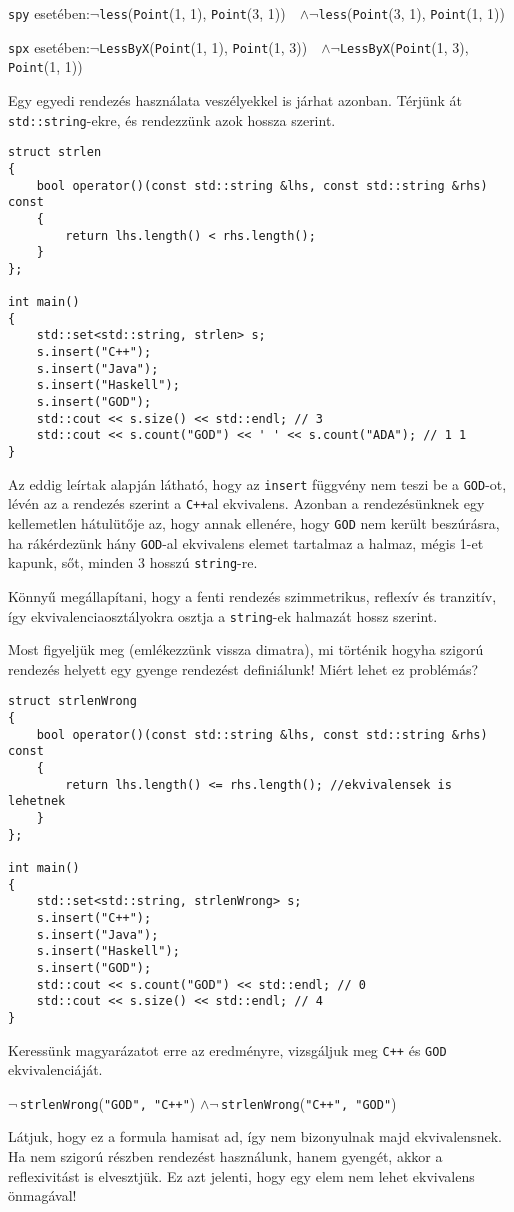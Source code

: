 \documentclass[a4paper,11.5pt,table]{article}
\begin{document}
	\begin{center}	
		\texttt{spy} esetében:\quad  $\neg$\texttt{less}\big(\texttt{Point}(1, 1), \texttt{Point}(3, 1)\big) \,\, $\wedge$\quad $\neg$\texttt{less}\big(\texttt{Point}(3, 1), \texttt{Point}(1, 1)\big)
		
		\texttt{spx} esetében:\quad  $\neg$\texttt{LessByX}\big(\texttt{Point}(1, 1), \texttt{Point}(1, 3)\big) \,\, $\wedge$\quad $\neg$\texttt{LessByX}\big(\texttt{Point}(1, 3), \texttt{Point}(1, 1)\big)
	\end{center}
	Egy egyedi rendezés használata veszélyekkel is járhat azonban. Térjünk át \texttt{std::string}-ekre, és rendezzünk azok hossza szerint.
	\begin{lstlisting}
struct strlen
{
	bool operator()(const std::string &lhs, const std::string &rhs) const
	{
		return lhs.length() < rhs.length();
	}
};

int main()
{
	std::set<std::string, strlen> s;
	s.insert("C++");
	s.insert("Java");
	s.insert("Haskell");
	s.insert("GOD");
	std::cout << s.size() << std::endl; // 3
	std::cout << s.count("GOD") << ' ' << s.count("ADA"); // 1 1
}
\end{lstlisting}
	Az eddig leírtak alapján látható, hogy az \texttt{insert} függvény nem teszi be a \texttt{GOD}-ot, lévén az a rendezés szerint a \texttt{C++}al ekvivalens. Azonban a rendezésünknek egy kellemetlen hátulütője az, hogy annak ellenére, hogy \texttt{GOD} nem került beszúrásra, ha rákérdezünk hány \texttt{GOD}-al ekvivalens elemet tartalmaz a halmaz, mégis 1-et kapunk, sőt, minden 3 hosszú \texttt{string}-re.
	\begin{note}
		Könnyű megállapítani, hogy a fenti rendezés szimmetrikus, reflexív és tranzitív, így ekvivalenciaosztályokra osztja a \texttt{string}-ek halmazát hossz szerint.
	\end{note}
	Most figyeljük meg (emlékezzünk vissza dimatra), mi történik hogyha szigorú rendezés helyett egy gyenge rendezést definiálunk! Miért lehet ez problémás?
\begin{lstlisting}
struct strlenWrong
{
	bool operator()(const std::string &lhs, const std::string &rhs) const
	{
		return lhs.length() <= rhs.length(); //ekvivalensek is lehetnek
	}
};

int main()
{
	std::set<std::string, strlenWrong> s;
	s.insert("C++");
	s.insert("Java");
	s.insert("Haskell");
	s.insert("GOD");
	std::cout << s.count("GOD") << std::endl; // 0
	std::cout << s.size() << std::endl; // 4
}
\end{lstlisting}
	Keressünk magyarázatot erre az eredményre, vizsgáljuk meg \texttt{C++} és \texttt{GOD} ekvivalenciáját.
	\begin{center}
		$\neg$\,\texttt{strlenWrong}\big(\texttt{"GOD", "C++"}\big)\quad 
		$\wedge$\quad $\neg$\,\texttt{strlenWrong}\big(\texttt{"C++", "GOD"}\big)
	\end{center}
	Látjuk, hogy ez a formula hamisat ad, így nem bizonyulnak majd ekvivalensnek. Ha nem szigorú részben rendezést használunk, hanem gyengét, akkor a reflexivitást is elvesztjük. Ez azt jelenti, hogy egy elem nem lehet ekvivalens önmagával!
	
\end{document}
